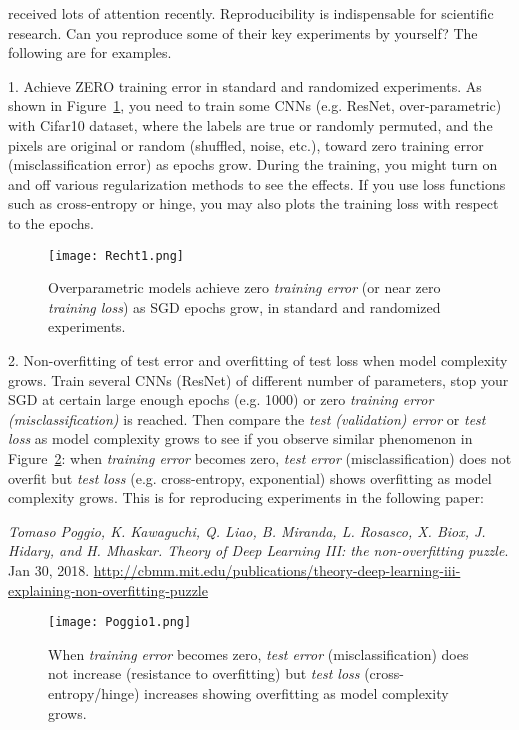 \documentclass[11pt]{article}
\begin{document}
\noindent received lots of attention recently. Reproducibility is indispensable for scientific research. Can you reproduce some of their key experiments by yourself? The following are for examples. 

1. Achieve ZERO training error in standard and randomized experiments. As shown in Figure~\ref{fig:Recht1}, you need to train some CNNs (e.g. ResNet, over-parametric) with Cifar10 dataset, where the labels are true or randomly permuted, and the pixels are original or random (shuffled, noise, etc.), toward zero training error (misclassification error) as epochs grow. During the training, you might turn on and off various regularization methods to see the effects. If you use loss functions such as cross-entropy or hinge, you may also plots the training loss with respect to the epochs. 
\begin{figure}
\begin{centering}
\texttt{[image: Recht1.png]}  
\caption{Overparametric models achieve zero \emph{training error} (or near zero \emph{training loss}) as SGD epochs grow, in standard and randomized experiments.}
\label{fig:Recht1}
\end{centering}
\end{figure}

2. Non-overfitting of test error and overfitting of test loss when model complexity grows. Train several CNNs (ResNet) of different number of parameters, stop your SGD at certain large enough epochs (e.g. 1000) or zero \emph{training error (misclassification)} is reached. Then compare the \emph{test (validation) error} or \emph{test loss} as model complexity grows to see if you observe similar phenomenon in Figure~\ref{fig:Poggio1}: when \emph{training error} becomes zero, \emph{test error} (misclassification) does not overfit but \emph{test loss} (e.g. cross-entropy, exponential) shows overfitting as model complexity grows. This is for reproducing experiments in the following paper: 

\emph{Tomaso Poggio, K. Kawaguchi, Q. Liao, B. Miranda, L. Rosasco, X. Biox, J. Hidary, and H. Mhaskar. Theory of Deep Learning III: the non-overfitting puzzle}. Jan 30, 2018. \url{http://cbmm.mit.edu/publications/theory-deep-learning-iii-explaining-non-overfitting-puzzle} 

\begin{figure}
\begin{centering}
\texttt{[image: Poggio1.png]}  
\caption{When \emph{training error} becomes zero, \emph{test error} (misclassification) does not increase (resistance to overfitting) but \emph{test loss} (cross-entropy/hinge) increases showing overfitting as model complexity grows.}
\label{fig:Poggio1}
\end{centering}
\end{figure}
\end{document}
